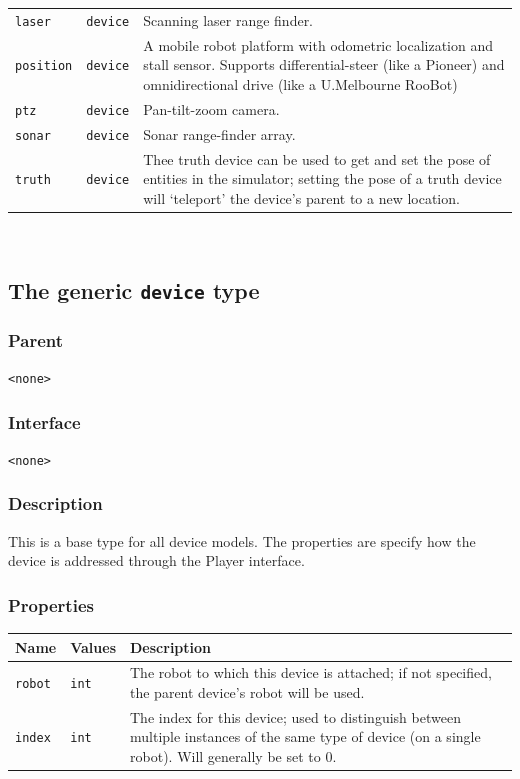 \documentclass[11pt,twoside]{report}
\begin{document}
\begin{tabularx}{\columnwidth}{llX}
\verb'laser' & \verb'device' & Scanning laser range finder.\\

\verb'position' & \verb'device' & A mobile robot platform with
odometric localization and stall sensor. Supports differential-steer
(like a Pioneer) and omnidirectional drive (like a U.Melbourne
RooBot)\\

\verb'ptz' & \verb'device' & Pan-tilt-zoom camera. \\

\verb'sonar' & \verb'device' & Sonar range-finder array.\\

\verb'truth' & \verb'device' & Thee truth device can be used to get
and set the pose of entities in the simulator; setting the pose of a
truth device will `teleport' the device's parent to a new location.\\

\hline
\end{tabularx}
\vspace{1em}\\

\newpage
\subsection{The generic {\tt device} type}

\subsubsection*{Parent}
{\tt <none>}

\subsubsection*{Interface}
{\tt <none>}


\subsubsection*{Description}
This is a base type for all device models. The properties are specify
how the device is addressed through the Player interface.

\subsubsection*{Properties}
\begin{tabularx}{\columnwidth}{llX}
\hline
Name & Values & Description \\
\hline

\verb'robot' & \verb'int' & The robot to which this device is attached;
if not specified, the parent device's robot will be used.\\

\verb'index' & \verb'int' & The index for this device; used to
distinguish between multiple instances of the same type of device (on
a single robot).  Will generally be set to 0.\\

\hline
\end{tabularx}
\end{document}
